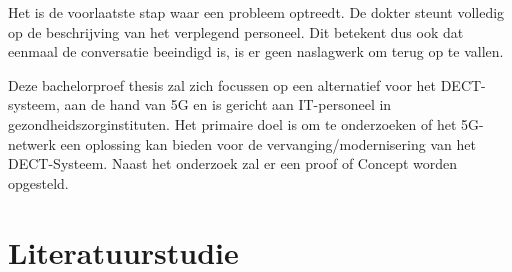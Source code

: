 Het is de voorlaatste stap waar een probleem optreedt. De dokter steunt volledig op de beschrijving van het verplegend personeel. Dit betekent dus ook dat eenmaal de conversatie beeindigd is, is er geen naslagwerk om terug op te vallen.

Deze bachelorproef thesis zal zich focussen op een alternatief voor het DECT-systeem, aan de hand van 5G en is gericht aan IT-personeel in gezondheidszorginstituten. Het primaire doel is om te onderzoeken of het 5G-netwerk een oplossing kan bieden voor de vervanging/modernisering van het DECT-Systeem. Naast het onderzoek zal er een proof of Concept worden opgesteld.


\section{Literatuurstudie}%
\label{sec:literatuurstudie}

